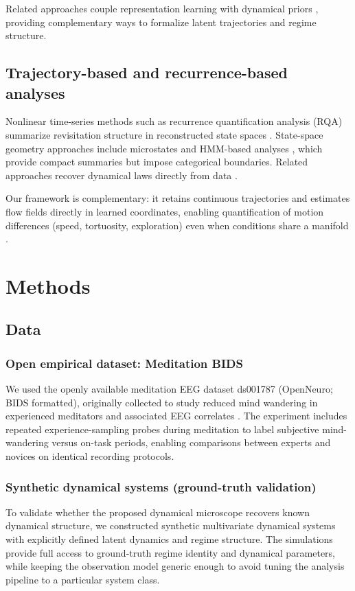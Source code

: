 \documentclass[5p,twocolumn,authoryear]{elsarticle}
\begin{document}
Related approaches couple representation learning with dynamical priors \citep{KingmaWelling2014,Pandarinath2018,Linderman2017rSLDS}, providing complementary ways to formalize latent trajectories and regime structure.

\subsection{Trajectory-based and recurrence-based analyses}

Nonlinear time-series methods such as recurrence quantification analysis (RQA) summarize revisitation structure in reconstructed state spaces \citep{Marwan2007}. State-space geometry approaches include microstates \citep{Michel2018} and HMM-based analyses \citep{Baker2014,Vidaurre2018}, which provide compact summaries but impose categorical boundaries. Related approaches recover dynamical laws directly from data \citep{Brunton2016,Schmid2010DMD,Chen2018}.

Our framework is complementary: it retains continuous trajectories and estimates flow fields directly in learned coordinates, enabling quantification of motion differences (speed, tortuosity, exploration) even when conditions share a manifold \citep{TognoliKelso2014,Deco2017}.

\section{Methods}

\subsection{Data}
\subsubsection{Open empirical dataset: Meditation BIDS}
We used the openly available meditation EEG dataset ds001787 (OpenNeuro; BIDS formatted), originally collected to study reduced mind wandering in experienced meditators and associated EEG correlates \citep{BrandmeyerDelorme2016,Delorme2018BIDS}. The experiment includes repeated experience-sampling probes during meditation to label subjective mind-wandering versus on-task periods, enabling comparisons between experts and novices on identical recording protocols.

\subsubsection{Synthetic dynamical systems (ground-truth validation)}
To validate whether the proposed dynamical microscope recovers known dynamical structure, we constructed synthetic multivariate dynamical systems with explicitly defined latent dynamics and regime structure. The simulations provide full access to ground-truth regime identity and dynamical parameters, while keeping the observation model generic enough to avoid tuning the analysis pipeline to a particular system class.
\end{document}
